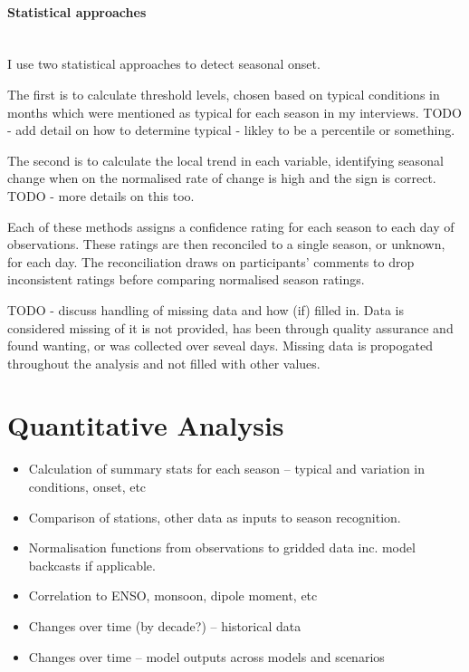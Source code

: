 \paragraph{Statistical approaches}~\\
I use two statistical approaches to detect seasonal onset.

The first is to calculate threshold levels, chosen based on typical conditions
in months which were mentioned as typical for each season in my interviews.
TODO - add detail on how to determine typical - likley to be a percentile or something.

The second is to calculate the local trend in each variable, identifying seasonal
change when on the normalised rate of change is high and the sign is correct.
TODO - more details on this too.

Each of these methods assigns a confidence rating for each season to each day of
observations.  These ratings are then reconciled to a single season, or unknown,
for each day.  The reconciliation draws on participants' comments to drop inconsistent
ratings before comparing normalised season ratings.


TODO - discuss handling of missing data and how (if) filled in.
Data is considered missing of it is not provided, has been through
quality assurance and found wanting, or was collected over seveal days.
Missing data is propogated throughout the analysis and not filled with other values.



\section{Quantitative Analysis}

\begin{itemize}
\item Calculation of summary stats for each season – typical and variation in conditions, onset, etc
\item Comparison of stations, other data as inputs to season recognition.
\item Normalisation functions from observations to gridded data inc. model backcasts if applicable.
\item Correlation to ENSO, monsoon, dipole moment, etc
\item Changes over time (by decade?) – historical data
\item Changes over time – model outputs across models and scenarios
\end{itemize}

